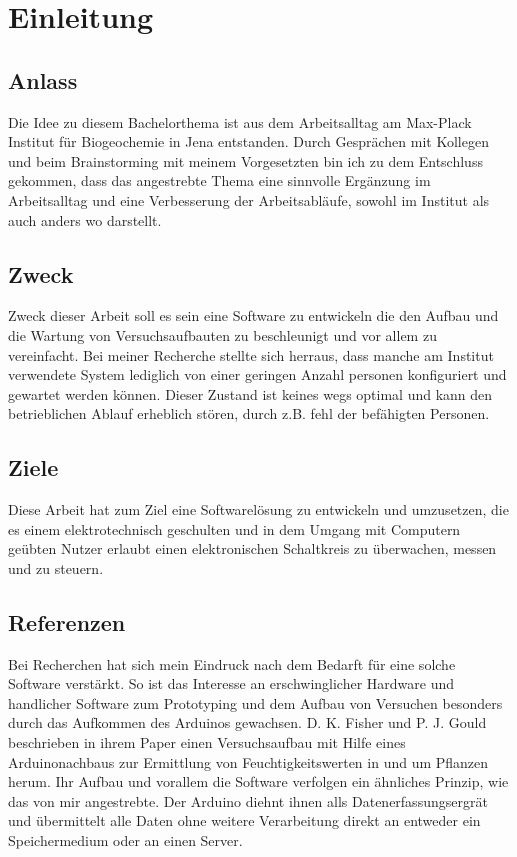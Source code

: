 \part{Einleitung}
\chapter{Anlass}
Die Idee zu diesem Bachelorthema ist aus dem Arbeitsalltag am Max-Plack Institut
für Biogeochemie in Jena entstanden. Durch Gesprächen mit Kollegen und beim
\gls{Brainstorming} mit meinem Vorgesetzten bin ich zu dem Entschluss gekommen, 
dass
das angestrebte Thema eine sinnvolle Ergänzung im Arbeitsalltag und eine
Verbesserung der Arbeitsabläufe, sowohl im Institut als auch anders wo
darstellt.

\chapter{Zweck}
Zweck dieser Arbeit soll es sein eine Software zu entwickeln die den Aufbau und
die Wartung von Versuchsaufbauten zu beschleunigt und vor allem zu
vereinfacht. Bei meiner Recherche stellte sich herraus, dass manche am Institut
verwendete System lediglich von einer geringen Anzahl personen konfiguriert und
gewartet werden können. Dieser Zustand ist keines wegs optimal und kann den
betrieblichen Ablauf erheblich stören, durch z.B. fehl der befähigten Personen.
\chapter{Ziele}
Diese Arbeit hat zum Ziel eine Softwarelösung zu entwickeln und umzusetzen, die 
es einem elektrotechnisch geschulten und in dem Umgang mit Computern geübten 
Nutzer erlaubt einen elektronischen Schaltkreis zu überwachen, messen und zu 
steuern.
\chapter{Referenzen}
Bei Recherchen hat sich mein Eindruck nach dem Bedarft für eine solche Software 
verstärkt. So ist das Interesse an erschwinglicher Hardware und handlicher 
Software zum Prototyping und dem Aufbau von Versuchen besonders durch das 
Aufkommen des Arduinos gewachsen. D. K. Fisher und P. J. 
Gould\citeauthor{ModernInstrumentation} beschrieben in ihrem Paper einen 
Versuchsaufbau mit Hilfe eines Arduinonachbaus zur Ermittlung von 
Feuchtigkeitswerten in und um Pflanzen herum. Ihr Aufbau und vorallem die 
Software verfolgen ein ähnliches Prinzip, wie das von mir angestrebte. Der 
Arduino diehnt ihnen alls Datenerfassungsergrät und übermittelt alle Daten ohne 
weitere Verarbeitung direkt an entweder ein Speichermedium oder an einen 
Server. 

